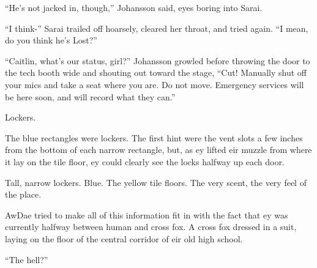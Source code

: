 ``He's not jacked in, though,'' Johansson said, eyes boring into Sarai.

``I think-'' Sarai trailed off hoarsely, cleared her throat, and tried again.  ``I mean, do you think he's Lost?''

``Caitlin, what's our status, girl?''  Johansson growled before throwing the door to the tech booth wide and shouting out toward the stage, ``Cut!  Manually shut off your mics and take a seat where you are.  Do not move.  Emergency services will be here soon, and will record what they can.''

\secdiv

Lockers.

The blue rectangles were lockers.  The first hint were the vent slots a few inches from the bottom of each narrow rectangle, but, as ey lifted eir muzzle from where it lay on the tile floor, ey could clearly see the locks halfway up each door.

Tall, narrow lockers.  Blue.  The yellow tile floors.  The very scent, the very feel of the place.

AwDae tried to make all of this information fit in with the fact that ey was currently halfway between human and cross fox.  A cross fox dressed in a suit, laying on the floor of the central corridor of eir old high school.

``The hell?''
